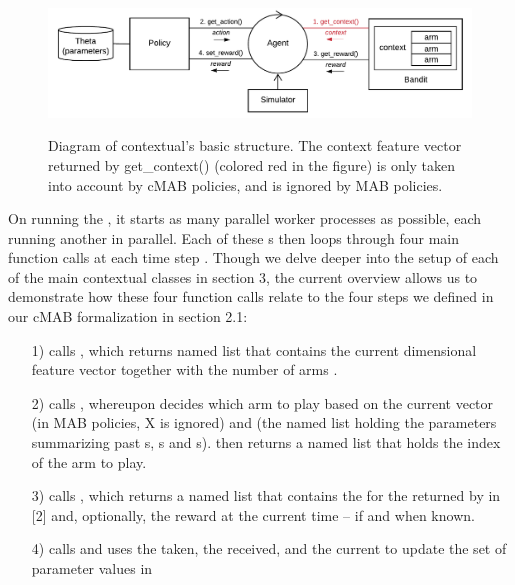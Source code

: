 \documentclass[nojss]{jss}\usepackage[]{graphicx}\usepackage[]{color}
\begin{document}
\begin{figure}[H]
  \centering
    \includegraphics[width=.99\textwidth]{fig/cmab_chart}
    \label{fig:cmab_chart}
      \caption{Diagram of contextual's basic structure. The context feature vector returned by get\_context() (colored red in the figure) is only taken into account by cMAB policies, and is ignored by MAB policies.}
\end{figure}

On running the , it starts as many parallel worker processes as possible, each running another  in parallel. Each of these s then loops through four main function calls at each time step . Though we delve deeper into the setup of each of the main contextual classes in section 3, the current overview allows us to demonstrate how these four function calls relate to the four steps we defined in our cMAB formalization in section 2.1:

\begin{enumerate}
         \item[1)]  calls , which returns named list  that contains the current  dimensional  feature vector  together with the number of arms .
         \item[2)]  calls , whereupon  decides which arm to play based on the current  vector  (in MAB policies, X is ignored) and  (the named list holding the parameters summarizing past s, s and s\footnotemark[\value{footnote}]).  then returns a named list  that holds the index of the arm to play.
         \item[3)]  calls , which returns a named list  that contains the  for the  returned by  in [2] and, optionally, the  reward at the current time  -- if and when known.
         \item[4)]  calls  and uses the  taken, the  received, and the current  to update the set of parameter values in 
\end{enumerate}
\end{document}
